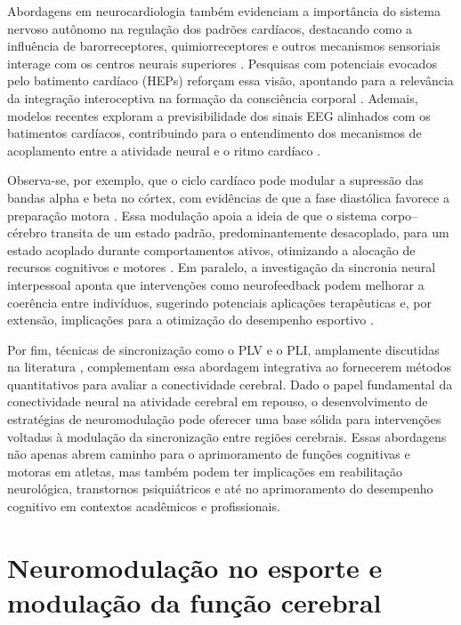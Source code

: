 Abordagens em neurocardiologia também evidenciam a importância do sistema nervoso autônomo na regulação dos padrões cardíacos, destacando como a influência de barorreceptores, quimiorreceptores e outros mecanismos sensoriais interage com os centros neurais superiores \cite{marcondes2024linguagem}. Pesquisas com potenciais evocados pelo batimento cardíaco (HEPs) reforçam essa visão, apontando para a relevância da integração interoceptiva na formação da consciência corporal \cite{park2018neural, banelli2020skipping, mackinnon2013utilizing}. Ademais, modelos recentes exploram a previsibilidade dos sinais EEG alinhados com os batimentos cardíacos, contribuindo para o entendimento dos mecanismos de acoplamento entre a atividade neural e o ritmo cardíaco \cite{vergara2024exploring}.

Observa-se, por exemplo, que o ciclo cardíaco pode modular a supressão das bandas alpha e beta no córtex, com evidências de que a fase diastólica favorece a preparação motora \cite{lai2024cardiac}. Essa modulação apoia a ideia de que o sistema corpo–cérebro transita de um estado padrão, predominantemente desacoplado, para um estado acoplado durante comportamentos ativos, otimizando a alocação de recursos cognitivos e motores \cite{criscuolo2022cognition}. Em paralelo, a investigação da sincronia neural interpessoal aponta que intervenções como neurofeedback podem melhorar a coerência entre indivíduos, sugerindo potenciais aplicações terapêuticas e, por extensão, implicações para a otimização do desempenho esportivo \cite{boecker2024interpersonal, konrad2024interpersonal}.

Por fim, técnicas de sincronização como o PLV e o PLI, amplamente discutidas na literatura \cite{seraj2018cerebral}, complementam essa abordagem integrativa ao fornecerem métodos quantitativos para avaliar a conectividade cerebral. Dado o papel fundamental da conectividade neural na atividade cerebral em repouso, o desenvolvimento de estratégias de neuromodulação pode oferecer uma base sólida para intervenções voltadas à modulação da sincronização entre regiões cerebrais. Essas abordagens não apenas abrem caminho para o aprimoramento de funções cognitivas e motoras em atletas, mas também podem ter implicações em reabilitação neurológica, transtornos psiquiátricos e até no aprimoramento do desempenho cognitivo em contextos acadêmicos e profissionais.

\section{Neuromodulação no esporte e modulação da função cerebral}

